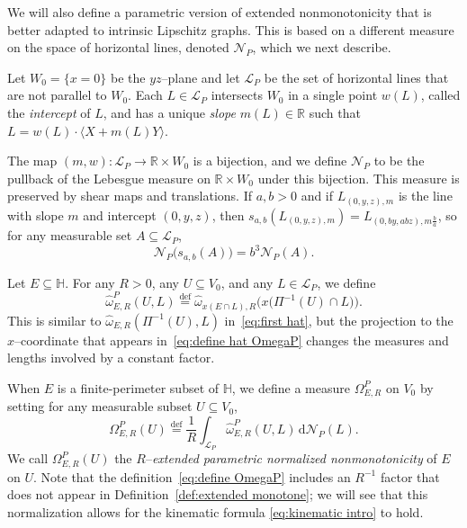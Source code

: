 \documentclass[11pt,reqno]{amsart}
\newcommand{\wwidehat}[1]{\widehat{#1}}
\renewcommand{\H}{\mathbb{H}}
\newcommand{\R}{\mathbb{R}}
\newcommand{\cL}{\mathcal{L}}
\newcommand{\cN}{\mathcal{N}}
\newcommand{\ud}[0]{\,\mathrm{d}}
\newcommand{\0}{\mathbf{0}}
\renewcommand{\1}{\mathbf 1}
\newcommand{\from}{\colon}
\renewcommand{\subset}{\subseteq}
\newcommand{\eqdef}{\stackrel{\mathrm{def}}{=}}
\renewcommand{\le}{\leqslant}
\newtheorem{cor}[thm]{Corollary}
\theoremstyle{remark}
\DeclareMathOperator{\NM}{NM}
\DeclareMathOperator{\diam}{diam}
\begin{document}

We will also define a parametric version of extended nonmonotonicity that is better adapted to intrinsic Lipschitz graphs.  This is based on a different measure on the space of horizontal lines, denoted $\cN_P$, which we next describe.

Let $W_0=\{x=0\}$ be the $yz$--plane and let $\cL_P$ be the set of horizontal lines that are not parallel to $W_0$.  Each $L\in \cL_P$ intersects $W_0$ in a single point $w(L)$, called the \emph{intercept} of $L$, and has a unique \emph{slope} $m(L)\in \R$ such that $L=w(L)\cdot \langle X+m(L)Y\rangle$.

The map $(m,w)\from \cL_P\to \R\times W_0$ is a bijection, and we define $\cN_P$ to be the pullback of the Lebesgue measure on $\R\times W_0$ under this bijection. This measure is preserved by shear maps and translations. If $a,b>0$ and if $L_{(0,y,z),m}$ is the line with slope $m$ and intercept $(0,y,z)$, then $s_{a,b}(L_{(0,y,z),m})=L_{(0,by,abz),m\frac{b}{a}}$, so for any measurable set $A\subset \cL_P$,
\begin{equation}\label{eq:transform N}
  \cN_P\big(s_{a,b}(A)\big)=b^3 \cN_P(A).
\end{equation}

Let $E \subset \H$.  For any $R>0$, any $U\subset V_0$, and any $L\in \cL_P$, we define
\begin{equation}\label{eq:define hat OmegaP}
  \wwidehat{\omega}^P_{E, R}(U, L) \eqdef \widehat{\omega}_{x(E \cap L),R}\Big(x\big(\Pi^{-1}(U)\cap L\big)\Big).
\end{equation}
This is similar to $\wwidehat{\omega}_{E, R}(\Pi^{-1}(U), L)$ in~\eqref{eq:first hat}, but the projection to the $x$--coordinate that appears in~\eqref{eq:define hat OmegaP} changes the measures and lengths involved by a constant factor.

When $E$ is a finite-perimeter subset of $\H$, we define a measure $\Omega^P_{E,R}$ on $V_0$ by setting for any measurable subset $U\subset V_0$,
\begin{equation}\label{eq:define OmegaP}
  \Omega^P_{E,R}(U)\eqdef \frac{1}{R}\int_{\cL_P} \wwidehat{\omega}^P_{E,R}(U,L)\ud \cN_P(L).
\end{equation}
We call $\Omega^P_{E, R}(U)$ the $R$--\emph{extended parametric normalized nonmonotonicity} of $E$ on $U$.  Note that the definition~\eqref{eq:define OmegaP} includes an $R^{-1}$ factor that does not appear in Definition~\ref{def:extended monotone}; we will see that this normalization allows for  the kinematic formula \eqref{eq:kinematic intro} to hold.
\end{document}
